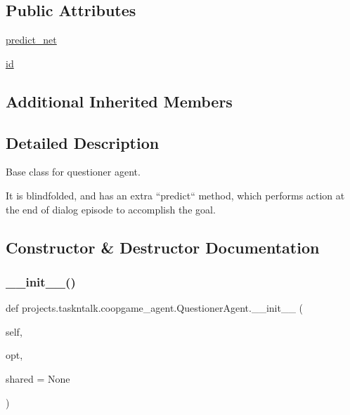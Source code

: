 \subsection*{Public Attributes}
\begin{DoxyCompactItemize}
\item 
\hyperlink{classprojects_1_1taskntalk_1_1coopgame__agent_1_1QuestionerAgent_a91db82359e87c125039573ba9070eab3}{predict\+\_\+net}
\item 
\hyperlink{classprojects_1_1taskntalk_1_1coopgame__agent_1_1QuestionerAgent_a485197cefeb040ec41e7a58ce2efe19c}{id}
\end{DoxyCompactItemize}
\subsection*{Additional Inherited Members}


\subsection{Detailed Description}
\begin{DoxyVerb}Base class for questioner agent.

It is blindfolded, and has an extra ``predict`` method, which performs action at the
end of dialog episode to accomplish the goal.
\end{DoxyVerb}
 

\subsection{Constructor \& Destructor Documentation}
\mbox{\label{classprojects_1_1taskntalk_1_1coopgame__agent_1_1QuestionerAgent_a09a21a7469462a1ad5d8b55b381e8d87}} 
\subsubsection{\texorpdfstring{\+\_\+\+\_\+init\+\_\+\+\_\+()}{\_\_init\_\_()}}
{\footnotesize\ttfamily def projects.\+taskntalk.\+coopgame\+\_\+agent.\+Questioner\+Agent.\+\_\+\+\_\+init\+\_\+\+\_\+ (\begin{DoxyParamCaption}\item[{}]{self,  }\item[{}]{opt,  }\item[{}]{shared = {\ttfamily None} }\end{DoxyParamCaption})}



